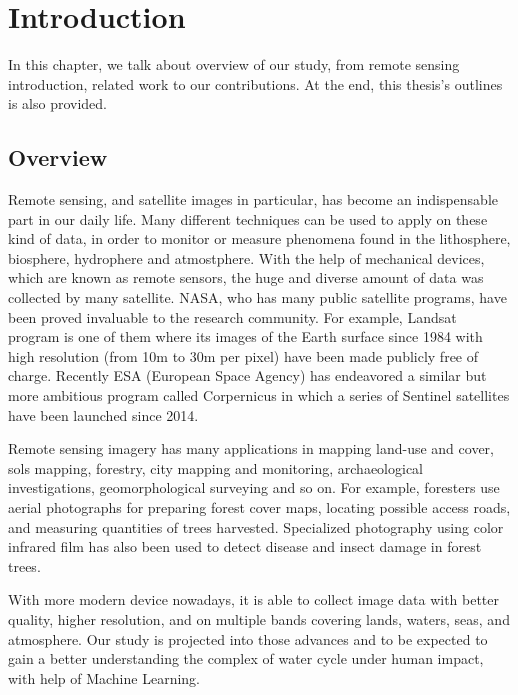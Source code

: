 \chapter{Introduction}
\label{chap-1-intro}
\begin{ChapAbstract}
In this chapter, we talk about overview of our study, from remote sensing introduction, related work to our contributions. At the end, this thesis's outlines is also provided.

\end{ChapAbstract}


\section{Overview} 

Remote sensing, and satellite images in particular, has become an indispensable part in our daily life. Many different techniques can be used to apply on these kind of data, in order to monitor or measure phenomena found in the lithosphere, biosphere, hydrophere and atmostphere. With the help of mechanical devices, which are known as remote sensors, the huge and diverse amount of data was collected by many satellite. NASA, who has many public satellite programs, have been proved invaluable to the research community. For example, Landsat program is one of them where its images of the Earth surface since 1984 with high resolution (from 10m to 30m per pixel) have been made publicly  free of charge. Recently ESA (European Space Agency) has endeavored a similar but more ambitious program called Corpernicus in which a series of Sentinel satellites have been launched since 2014.

Remote sensing imagery has many applications in mapping land-use and cover, sols mapping, forestry, city mapping and monitoring, archaeological investigations, geomorphological surveying and so on. For example, foresters use aerial photographs for preparing forest cover maps, locating possible access roads, and measuring quantities of trees harvested. Specialized photography using color infrared film has also been used to detect disease and insect damage in forest trees. 

With more modern device nowadays, it is able to collect image data with better quality, higher resolution, and on multiple bands covering lands, waters, seas, and atmosphere. Our study is projected into those advances and to be expected to gain a better understanding the complex of water cycle under human impact, with help of Machine Learning.


